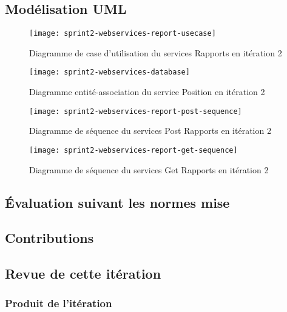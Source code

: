 \subsection{Modélisation UML}

\begin{figure}[htbp]
    \centering
    \texttt{[image: sprint2-webservices-report-usecase]}
    \caption{Diagramme de case d'utilisation du services Rapports en itération 2}
\end{figure}

\begin{figure}[htbp]
    \centering
    \texttt{[image: sprint2-webservices-database]}
    \caption{Diagramme entité-association du service Position en itération 2}
\end{figure}

\begin{figure}[htbp]
    \centering
    \texttt{[image: sprint2-webservices-report-post-sequence]}
    \caption{Diagramme de séquence du services Post Rapports en itération 2}
\end{figure}

\begin{figure}[htbp]
    \centering
    \texttt{[image: sprint2-webservices-report-get-sequence]}
    \caption{Diagramme de séquence du services Get Rapports en itération 2}
\end{figure}

\subsection{Évaluation suivant les normes mise}


\subsection{Contributions}


\subsection{Revue de cette itération}

\subsubsection{Produit de l'itération}

